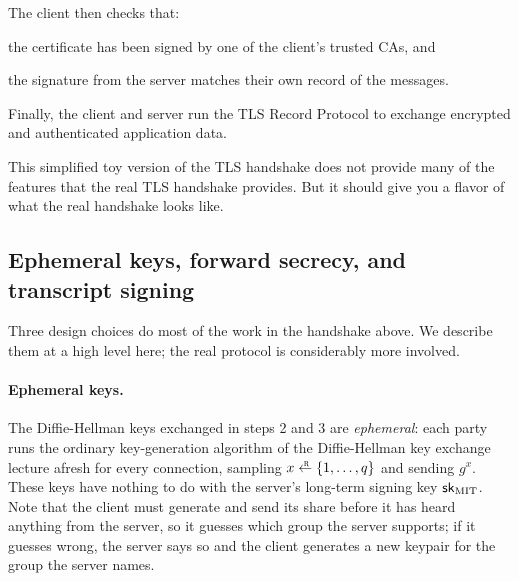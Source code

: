 \begin{compactenum}
\item The client then checks that:
	\begin{compactitem}
	\item the certificate has been signed by one of the client's trusted CAs, and
	\item the signature from the server matches their own record of the messages.
	\end{compactitem}
\item Finally, the client and server run the TLS Record Protocol to exchange encrypted and authenticated application data.
\end{compactenum}

This simplified toy version of the TLS handshake 
does not provide many of the features that the real TLS handshake
provides. But it should give you a flavor of what the real 
handshake looks like.

\subsection{Ephemeral keys, forward secrecy, and transcript signing}
\label{sec:tls:ephemeral}

Three design choices do most of the work in the handshake above.  We
describe them at a high level here; the real protocol is considerably
more involved.

\paragraph{Ephemeral keys.}
The Diffie-Hellman keys exchanged in steps 2 and 3 are \emph{ephemeral}:
each party runs the ordinary key-generation algorithm of
the Diffie-Hellman key exchange lecture afresh for every connection, sampling $x \getsr
\{1, \dots, q\}$ and sending $g^x$.  These keys have nothing to do with
the server's long-term signing key ${\mathsf{sk}}_\text{MIT}$.  Note that the
client must generate and send its share before it has heard anything
from the server, so it guesses which group the server supports; if it
guesses wrong, the server says so and the client generates a new
keypair for the group the server names.

